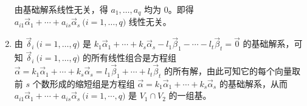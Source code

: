 \begin{solve}
\begin{enumerate}
		由基础解系线性无关，得 $a_1, \ldots, a_q$ 均为 $0$。即得 $a_{i1} \vec \alpha_1 + \cdots + a_{is} \vec \alpha_s \pod{i = 1, \ldots, q}$ 线性无关。

		\item 由 $\vec \delta_i \pod{i = 1, \ldots, q}$ 是 $k_1 \vec \alpha_1 + \cdots + k_s \vec \alpha_s - l_1 \vec \beta_1 - \cdots - l_t \vec \beta_t = \vec 0$ 的基础解系，可知 $\vec \delta_i \pod{i = 1, \ldots, q}$ 的所有线性组合是方程组 $\vec \alpha = k_1 \vec \alpha_1 + \cdots + k_s \vec \alpha_s = l_1 \vec \beta_1 + \cdots + l_t \vec \beta_t$ 的所有解，由此可知它的每个向量取前 $s$ 个数形成的缩短组是方程组 $\vec \alpha = k_1 \vec \alpha_1 + \cdots + k_s \vec \alpha_s$ 的基础解系，从而 $a_{i1} \vec \alpha_1 + \cdots + a_{is} \vec \alpha_s \pod{i = 1, \cdots, q}$ 是 $V_1 \cap V_2$ 的一组基。
	\end{enumerate}
\end{solve}